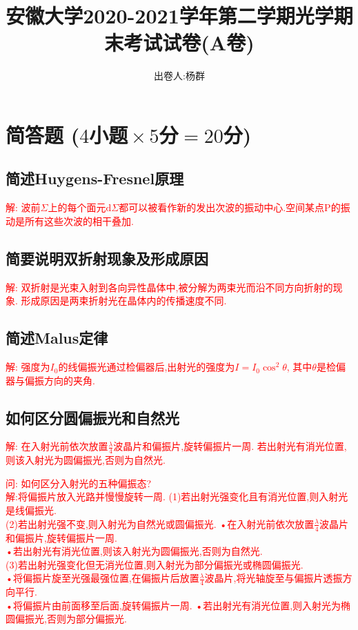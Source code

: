 \documentclass[UTF8]{article}
\title{安徽大学2020-2021学年第二学期光学期末考试试卷(A卷)}
\author{出卷人:杨群}
\date{}
\newcommand\ptsMulti[3]{ \small($#1\!\!$小题$\!\!\times #2\!\!$分$\!\!=\!\!#3\!\!$分)}
\begin{document}
    \maketitle

    \section{\large\textbf{简答题}\ptsMulti{4}{5}{20}}

    \subsection{简述Huygens-Fresnel原理}
    \noindent \textcolor{red}{解: 波前$\Sigma$上的每个面元$\mathrm{d}\Sigma$都可以被看作新的发出次波的振动中心.空间某点P的振动是所有这些次波的相干叠加.}

    \subsection{简要说明双折射现象及形成原因}
    \noindent \textcolor{red}{解: 双折射是光束入射到各向异性晶体中,被分解为两束光而沿不同方向折射的现象. 形成原因是两束折射光在晶体内的传播速度不同.}

    \subsection{简述Malus定律}
    \noindent \textcolor{red}{解: 强度为$I_0$的线偏振光通过检偏器后,出射光的强度为$I=I_0 \cos^2 \theta$, 其中$\theta$是检偏器与偏振方向的夹角.}

    \subsection{如何区分圆偏振光和自然光}
    \noindent \textcolor{red}{解: 在入射光前依次放置$\frac{\lambda}{4}$波晶片和偏振片,旋转偏振片一周. 若出射光有消光位置,则该入射光为圆偏振光,否则为自然光.}

    \noindent \textcolor{red}{\small 问: 如何区分入射光的五种偏振态?\\ 解:将偏振片放入光路并慢慢旋转一周. (1)若出射光强变化且有消光位置,则入射光是线偏振光.\\ (2)若出射光强不变,则入射光为自然光或圆偏振光. •在入射光前依次放置$\frac{\lambda}{4}$波晶片和偏振片,旋转偏振片一周.\\ •若出射光有消光位置,则该入射光为圆偏振光,否则为自然光.\\ (3)若出射光强变化但无消光位置,则入射光为部分偏振光或椭圆偏振光.\\ •将偏振片旋至光强最强位置,在偏振片后放置$\frac{\lambda}{4}$波晶片,将光轴旋至与偏振片透振方向平行.\\ •将偏振片由前面移至后面,旋转偏振片一周. •若出射光有消光位置,则入射光为椭圆偏振光,否则为部分偏振光.}
\end{document}
